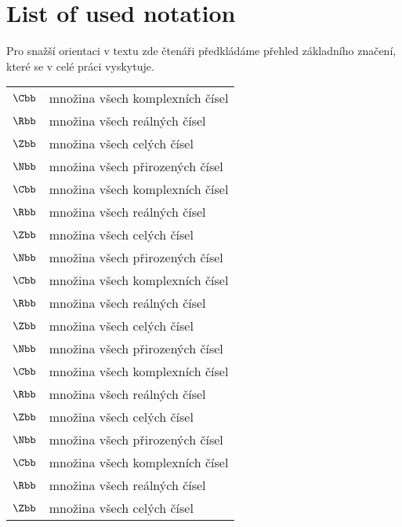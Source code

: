 \chapter*{List of used notation}

Pro snažší orientaci v textu zde čtenáři předkládáme přehled základního značení, které se v celé práci vyskytuje.
\begin{flushleft}
\begin{longtable}[l]{ll} %
  $\Cbb$                 & množina všech komplexních čísel \\[1mm]
  $\Rbb$                 & množina všech reálných čísel \\[1mm]
  $\Zbb$                 & množina všech celých čísel \\[1mm]
  $\Nbb$                 & množina všech přirozených čísel\\[1mm]
  $\Cbb$                 & množina všech komplexních čísel \\[1mm]
  $\Rbb$                 & množina všech reálných čísel \\[1mm]
  $\Zbb$                 & množina všech celých čísel \\[1mm]
  $\Nbb$                 & množina všech přirozených čísel\\[1mm]
  $\Cbb$                 & množina všech komplexních čísel \\[1mm]
  $\Rbb$                 & množina všech reálných čísel \\[1mm]
  $\Zbb$                 & množina všech celých čísel \\[1mm]
  $\Nbb$                 & množina všech přirozených čísel\\[1mm]
  $\Cbb$                 & množina všech komplexních čísel \\[1mm]
  $\Rbb$                 & množina všech reálných čísel \\[1mm]
  $\Zbb$                 & množina všech celých čísel \\[1mm]
  $\Nbb$                 & množina všech přirozených čísel\\[1mm]
  $\Cbb$                 & množina všech komplexních čísel \\[1mm]
  $\Rbb$                 & množina všech reálných čísel \\[1mm]
  $\Zbb$                 & množina všech celých čísel \\[1mm]
\end{longtable}
\end{flushleft}
